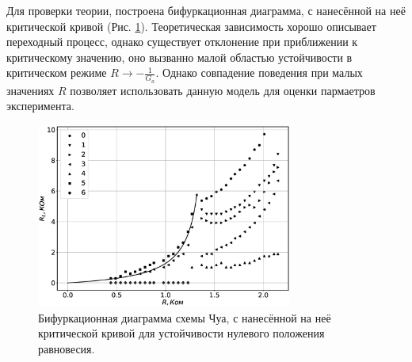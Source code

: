 \documentclass[12pt]{article}
\begin{document}
Для проверки теории, построена бифуркационная диаграмма, с нанесённой на неё критической кривой (Рис. \ref{fig:critical_line}).
Теоретическая зависимость хорошо описывает переходный процесс, однако существует отклонение при приближении к критическому значению,
оно вызванно малой областью устойчивости в критическом режиме $R \to -\frac{1}{G_a}$. Однако совпадение поведения при малых значениях $R$
позволяет использовать данную модель для оценки пармаетров эксперимента.
\begin{figure}[H]
	\centering
	\includegraphics[width=0.75\textwidth]{critical_line_teor.eps}
	\caption{Бифуркационная диаграмма схемы Чуа, с нанесённой на неё критической кривой для устойчивости нулевого положения равновесия.}
	\label{fig:critical_line}
\end{figure}
\end{document}
